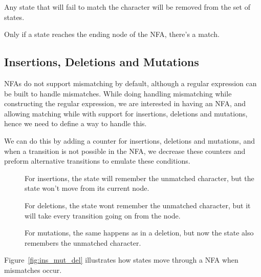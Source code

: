 Any state that will fail to match the character will be removed from the set of states.

Only if a state reaches the ending node of the NFA, there's a match.

\newpage

\subsection{Insertions, Deletions and Mutations}
NFAs do not support mismatching by default, although a regular expression can be built to handle mismatches. While doing handling mismatching while constructing the regular expression, we are interested in having an NFA, and allowing matching while with support for insertions, deletions and mutations, hence we need to define a way to handle this.

We can do this by adding a counter for insertions, deletions and mutations, and when a transition is not possible in the NFA, we decrease these counters and preform alternative transitions to emulate these conditions.
\begin{description}
\item[] For insertions, the state will remember the unmatched character, but the state won't move from its current node.
\item[]For deletions, the state wont remember the unmatched character, but it will take every transition going on from the node.
\item[] For mutations, the same happens as in a deletion, but now the state also remembers the unmatched character.
\end{description}
Figure~\ref{fig:ins_mut_del} illustrates how states move through a NFA when mismatches occur. 

